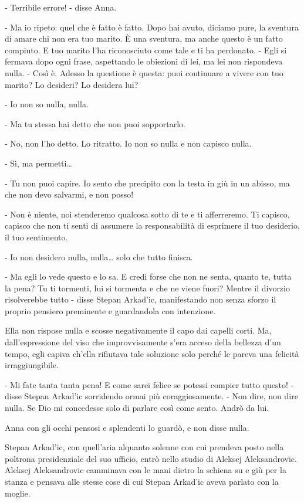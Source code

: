 - Terribile errore! - disse Anna. 

- Ma io ripeto: quel che è fatto è fatto. Dopo hai avuto, diciamo pure, la sventura di amare chi non era tuo marito. È una sventura, ma anche questo è un fatto compiuto. E tuo marito l'ha riconosciuto come tale e ti ha perdonato. - Egli si fermava dopo ogni frase, aspettando le obiezioni di lei, ma lei non rispondeva nulla. - Così è. Adesso la questione è questa: puoi continuare a vivere con tuo marito? Lo desideri? Lo desidera lui? 

- Io non so nulla, nulla. 

- Ma tu stessa hai detto che non puoi sopportarlo. 

- No, non l'ho detto. Lo ritratto. Io non so nulla e non capisco nulla. 

- Sì, ma permetti\ldots{} 

- Tu non puoi capire. Io sento che precipito con la testa in giù in un abisso, ma che non devo salvarmi, e non posso! 

- Non è niente, noi stenderemo qualcosa sotto di te e ti afferreremo. Ti capisco, capisco che non ti senti di assumere la responsabilità di esprimere il tuo desiderio, il tuo sentimento. 

- Io non desidero nulla, nulla\ldots{} solo che tutto finisca. 

- Ma egli lo vede questo e lo sa. E credi forse che non ne senta, quanto te, tutta la pena? Tu ti tormenti, lui si tormenta e che ne viene fuori? Mentre il divorzio risolverebbe tutto - disse Stepan Arkad'ic, manifestando non senza sforzo il proprio pensiero preminente e guardandola con intenzione. 

Ella non rispose nulla e scosse negativamente il capo dai capelli corti. Ma, dall'espressione del viso che improvvisamente s'era acceso della bellezza d'un tempo, egli capiva ch'ella rifiutava tale soluzione solo perché le pareva una felicità irraggiungibile. 

- Mi fate tanta tanta pena! E come sarei felice se potessi compier tutto questo! - disse Stepan Arkad'ic sorridendo ormai più coraggiosamente. - Non dire, non dire nulla. Se Dio mi concedesse solo di parlare così come sento. Andrò da lui. 

Anna con gli occhi pensosi e splendenti lo guardò, e non disse nulla. 

Stepan Arkad'ic, con quell'aria alquanto solenne con cui prendeva posto nella poltrona presidenziale del suo ufficio, entrò nello studio di Aleksej Aleksandrovic. Aleksej Aleksandrovic camminava con le mani dietro la schiena su e giù per la stanza e pensava alle stesse cose di cui Stepan Arkad'ic aveva parlato con la moglie. 

